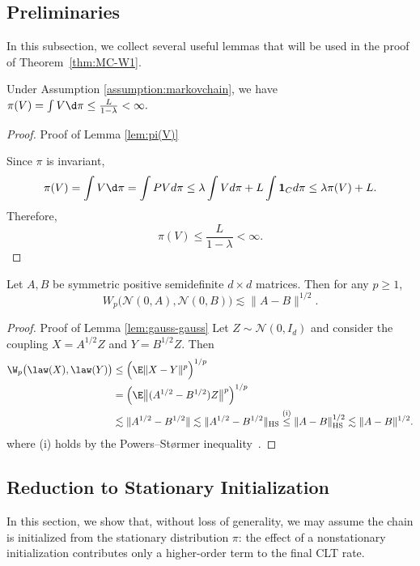 \documentclass[mnsc,nonblindrev]{informs3}
\begin{document}
\subsection{Preliminaries}
In this subsection, we collect several useful lemmas that will be used in the proof of Theorem~\ref{thm:MC-W1}.
\begin{lemma}\label{lem:pi(V)}
Under Assumption \ref{assumption:markovchain}, we have $\pi(V)=\int V\d\pi\le \frac{L}{1-\lambda}<\infty.$
\end{lemma}
\begin{proof}{Proof of Lemma \ref{lem:pi(V)}}

    Since $\pi$ is invariant,
\[
\pi(V)=\int V\d\pi = \int PVd\pi \le \lambda \int Vd\pi + L\int \mathbf{1}_Cd\pi \le \lambda\pi(V)+L .
\]
Therefore,
\[
\pi(V)\le \frac{L}{1-\lambda}<\infty.
\]
\end{proof}
\begin{lemma}
\label{lem:gauss-gauss}
Let $A,B$ be symmetric positive semidefinite $d\times d$ matrices.
Then for any $p \geq 1$,
\[
W_{p}\bigl(\mathcal N(0,A),\mathcal N(0,B)\bigr) \lesssim \|A-B\|^{1/2}.
\]
\end{lemma}
\begin{proof}{Proof of Lemma \ref{lem:gauss-gauss}}
Let $Z\sim\mathcal N(0,I_d)$ and consider the coupling $X=A^{1/2}Z$ and $Y=B^{1/2}Z$. Then
\begin{align*}
\W_p\bigl(\law(X),\law(Y)\bigr)
&\le \Bigl(\E\|X-Y\|^p\Bigr)^{1/p} \\
&= \Bigl(\E\bigl\|(A^{1/2}-B^{1/2})Z\bigr\|^p\Bigr)^{1/p} \\
&\lesssim \|A^{1/2}-B^{1/2}\|
\lesssim \|A^{1/2}-B^{1/2}\|_{\mathrm{HS}}
\overset{\text{(i)}}{\leq} \|A-B\|_{\mathrm{HS}}^{1/2} \lesssim \|A-B\|^{1/2}.
\end{align*}
where (i) holds by the Powers–Størmer inequality~\citep{powers1970free}.
\end{proof}

\subsection{Reduction to Stationary Initialization}\label{sec:stationary}
In this section, we show that, without loss of generality, we may assume the chain is initialized from the stationary distribution $\pi$: the effect of a nonstationary initialization contributes only a higher-order term to the final CLT rate.
\end{document}
